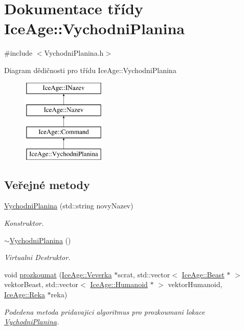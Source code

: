 \hypertarget{classIceAge_1_1VychodniPlanina}{}\section{Dokumentace třídy Ice\+Age\+:\+:Vychodni\+Planina}
\label{classIceAge_1_1VychodniPlanina}


{\ttfamily \#include $<$Vychodni\+Planina.\+h$>$}

Diagram dědičnosti pro třídu Ice\+Age\+:\+:Vychodni\+Planina\begin{figure}[H]
\begin{center}
\leavevmode
\includegraphics[height=4.000000cm]{dd/da7/classIceAge_1_1VychodniPlanina}
\end{center}
\end{figure}
\subsection*{Veřejné metody}
\begin{DoxyCompactItemize}
\item 
\hyperlink{classIceAge_1_1VychodniPlanina_a679da22865d75e93d1631106f5985b54}{Vychodni\+Planina} (std\+::string novy\+Nazev)
\begin{DoxyCompactList}\small\item\em Konstruktor. \end{DoxyCompactList}\item 
\hyperlink{classIceAge_1_1VychodniPlanina_ab5893e0634c3c34aaf979c0b4df583f7}{$\sim$\+Vychodni\+Planina} ()
\begin{DoxyCompactList}\small\item\em Virtualni Destruktor. \end{DoxyCompactList}\item 
void \hyperlink{classIceAge_1_1VychodniPlanina_af101def5e75ce2eb54c221063ee6ffca}{prozkoumat} (\hyperlink{classIceAge_1_1Veverka}{Ice\+Age\+::\+Veverka} $\ast$scrat, std\+::vector$<$ \hyperlink{classIceAge_1_1Beast}{Ice\+Age\+::\+Beast} $\ast$ $>$ vektor\+Beast, std\+::vector$<$ \hyperlink{classIceAge_1_1Humanoid}{Ice\+Age\+::\+Humanoid} $\ast$ $>$ vektor\+Humanoid, \hyperlink{classIceAge_1_1Reka}{Ice\+Age\+::\+Reka} $\ast$reka)
\begin{DoxyCompactList}\small\item\em Podedena metoda pridavajici algoritmus pro prozkoumani lokace \hyperlink{classIceAge_1_1VychodniPlanina}{Vychodni\+Planina}. \end{DoxyCompactList}\end{DoxyCompactItemize}
